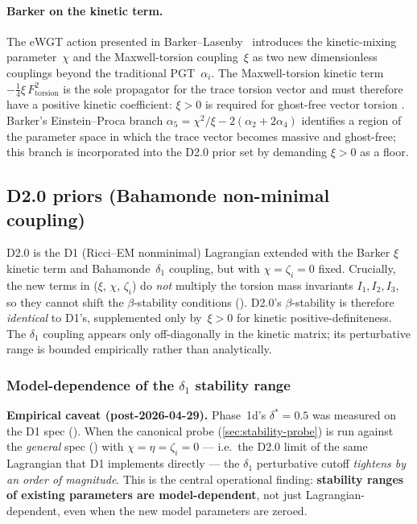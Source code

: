 \paragraph{Barker on the kinetic term.}
The eWGT action presented in Barker--Lasenby~\cite[line~219]{barker2024poincare}
introduces the kinetic-mixing parameter~$\chi$ and
the Maxwell-torsion coupling~$\xi$ as
two new dimensionless couplings beyond the traditional PGT~$\alpha_i$.  The
Maxwell-torsion kinetic term~$-\tfrac{1}{4}\xi\, F_{\mathrm{torsion}}^2$ is the
sole propagator for the trace torsion vector and must therefore have a positive
kinetic coefficient: $\xi > 0$ is required for ghost-free vector torsion
\cite[line~277]{barker2024poincare}.  Barker's Einstein--Proca branch
$\alpha_5 = \chi^2/\xi - 2(\alpha_2 + 2\alpha_4)$ identifies a region of the
parameter space in which the trace vector becomes massive and ghost-free; this
branch is incorporated into the D2.0 prior set by demanding $\xi > 0$ as a
floor.

\subsection{D2.0 priors (Bahamonde non-minimal coupling)}
\label{sec:d20-priors}

D2.0 is the D1 (Ricci--EM nonminimal) Lagrangian extended with the Barker
$\xi$ kinetic term and Bahamonde~$\delta_1$ coupling, but with $\chi=\zeta_i=0$
fixed.  Crucially, the new terms in
 ($\xi$,
$\chi$, $\zeta_i$) do \emph{not} multiply the torsion mass invariants
$I_1, I_2, I_3$, so they cannot shift the $\beta$-stability conditions
().  D2.0's $\beta$-stability is
therefore \emph{identical} to D1's, supplemented only by~$\xi > 0$ for kinetic
positive-definiteness.  The $\delta_1$ coupling appears only off-diagonally in
the kinetic matrix; its perturbative range is bounded empirically rather than
analytically.

\subsubsection*{Model-dependence of the $\delta_1$ stability range}
\label{sec:delta1-model-dependence}

\textbf{Empirical caveat (post-2026-04-29).}  Phase~1d's $\delta^*=0.5$ was
measured on the D1 spec
().  When the
canonical probe (\cref{sec:stability-probe}) is run against the
\emph{general} spec
() with
$\chi=\eta=\zeta_i=0$ --- i.e.\ the D2.0 limit of the same Lagrangian
that D1 implements directly --- the $\delta_1$ perturbative cutoff
\emph{tightens by an order of magnitude}.  This is the central operational
finding: \textbf{stability ranges of existing parameters are model-dependent},
not just Lagrangian-dependent, even when the new model parameters are zeroed.

